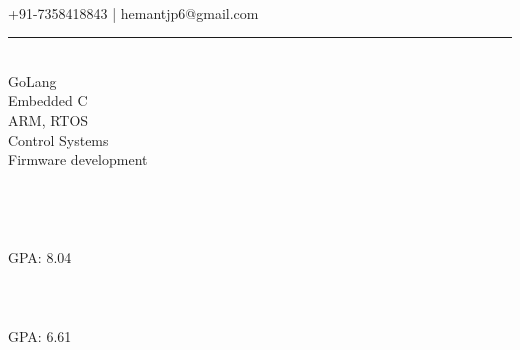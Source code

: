 \documentclass[]{hemant-style}
\begin{document}
        \begin{minipage}[]{\textwidth}
                \begin{minipage}[t][4em][c]{\textwidth}
                    \\
                    +91-7358418843 | hemantjp6@gmail.com\\
                \end{minipage}
                \hrule
                \vspace{1em}
                \begin{minipage}{\textwidth}
                        \begin{minipage}[t][][c]{.25\textwidth}
                             \\
                            GoLang\\ 
                            Embedded C\\
                            ARM, RTOS\\
                            Control Systems\\
                            Firmware  development\\
                            \newline
                             \\
                            \\
                            \\
                            \\
                            GPA: 8.04\\
                            \newline
                            \\
                            \\
                            \\
                            GPA: 6.61\\
                            \newline
                            \\

\end{minipage}
\end{minipage}
\end{minipage}
\end{document}
